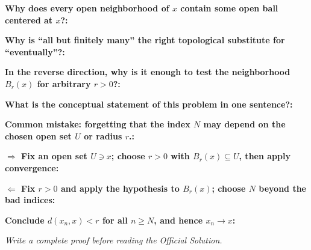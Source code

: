 \documentclass[12pt]{article}
\newcommand{\fillfield}[1]{%
  \par\noindent\textbf{#1:}\enspace\hrulefill\par\vspace{3pt}%
}
\newcommand{\writespace}[1]{\vspace{#1}}
\begin{document}
\bigskip

\begin{tcolorbox}[
  enhanced, breakable,
  colback  = pass3orange,
  colframe = orange!65!black,
  fonttitle = \bfseries,
  title = {Pass 3 \enspace\textbf{--}\enspace Self-Explanation}
]
\fillfield{Why does every open neighborhood of $x$ contain some open ball centered at $x$?}
\fillfield{Why is ``all but finitely many'' the right topological substitute for ``eventually''?}
\fillfield{In the reverse direction, why is it enough to test the neighborhood $B_r(x)$ for arbitrary $r>0$?}
\fillfield{What is the conceptual statement of this problem in one sentence?}
\fillfield{Common mistake: forgetting that the index $N$ may depend on the chosen open set $U$ or radius $r$.}
\end{tcolorbox}

\newpage

\begin{tcolorbox}[
  enhanced, breakable,
  colback  = pass4purple,
  colframe = purple!55!black,
  fonttitle = \bfseries,
  title = {Pass 4 \enspace\textbf{--}\enspace Skeleton Proof}
]
\noindent\textbf{$\Longrightarrow$ Fix an open set $U\ni x$; choose $r>0$ with $B_r(x)\subseteq U$, then apply convergence:}\par
\writespace{1.6cm}
\noindent\textbf{$\Longleftarrow$ Fix $r>0$ and apply the hypothesis to $B_r(x)$; choose $N$ beyond the bad indices:}\par
\writespace{1.8cm}
\noindent\textbf{Conclude $d(x_n,x)<r$ for all $n\ge N$, and hence $x_n\to x$:}\par
\writespace{1.0cm}
\end{tcolorbox}

\newpage

\begin{tcolorbox}[
  enhanced, breakable,
  colback  = pass5gray,
  colframe = black!38,
  fonttitle = \bfseries,
  title = {Pass 5 \enspace\textbf{--}\enspace Full Proof Attempt}
]
\small\itshape Write a complete proof before reading the Official Solution.\par
\normalfont\normalsize
\writespace{19cm}
\end{tcolorbox}

\newpage
\end{document}
